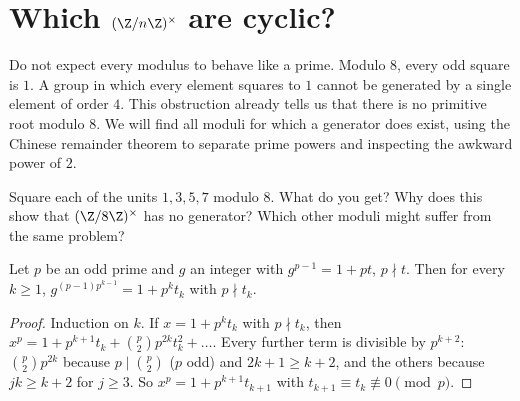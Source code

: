 \section{Which \texorpdfstring{$(\Z/n\Z)^\times$}{(Z/nZ)*} are cyclic?}

Do not expect every modulus to behave like a prime. Modulo $8$, every odd square is $1$. A group in which every element squares to $1$ cannot be generated by a single element of order $4$. This obstruction already tells us that there is no primitive root modulo $8$. We will find all moduli for which a generator does exist, using the Chinese remainder theorem to separate prime powers and inspecting the awkward power of $2$.

\begin{think}
Square each of the units $1,3,5,7$ modulo $8$. What do you get? Why does this show that $(\Z/8\Z)^\times$ has no generator? Which other moduli might suffer from the same problem?
\end{think}

\begin{lemma}\label{lem:lift}
Let $p$ be an odd prime and $g$ an integer with $g^{p-1}=1+pt$, $p\nmid t$. Then for every $k\ge1$, $g^{(p-1)p^{k-1}}=1+p^kt_k$ with $p\nmid t_k$.
\end{lemma}
\begin{proof}
Induction on $k$. If $x=1+p^kt_k$ with $p\nmid t_k$, then
$x^p=1+p^{k+1}t_k+\binom p2p^{2k}t_k^2+\dots$. Every further term is divisible by $p^{k+2}$: $\binom p2p^{2k}$ because $p\mid\binom p2$ ($p$ odd) and $2k+1\ge k+2$, and the others because $jk\ge k+2$ for $j\ge3$. So $x^p=1+p^{k+1}t_{k+1}$ with $t_{k+1}\equiv t_k\not\equiv0\pmod p$.
\end{proof}

